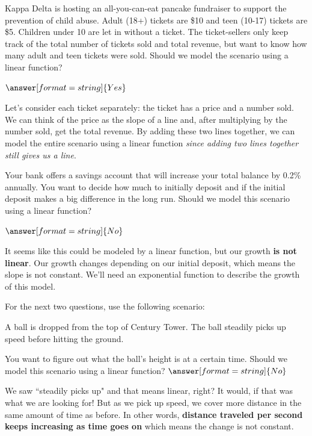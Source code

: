 \documentclass{ximera}
\begin{document}
\begin{question}
Kappa Delta is hosting an all-you-can-eat pancake fundraiser to support the prevention of child abuse. Adult (18+) tickets are \$10 and teen (10-17) tickets are \$5. Children under 10 are let in without a ticket. The ticket-sellers only keep track of the total number of tickets sold and total revenue, but want to know how many adult and teen tickets were sold. Should we model the scenario using a linear function?

$\answer[format=string]{Yes}$

\begin{feedback}
Let's consider each ticket separately: the ticket has a price and a number sold. We can think of the price as the slope of a line and, after multiplying by the number sold, get the total revenue. By adding these two lines together, we can model the entire scenario using a linear function \textit{since adding two lines together still gives us a line}.
\end{feedback}

\end{question}

\begin{question}
Your bank offers a savings account that will increase your total balance by 0.2\% annually. You want to decide how much to initially deposit and if the initial deposit makes a big difference in the long run. Should we model this scenario using a linear function?

$\answer[format=string]{No}$

\begin{feedback}
It seems like this could be modeled by a linear function, but our growth \textbf{is not linear}. Our growth changes depending on our initial deposit, which means the slope is not constant. We'll need an exponential function to describe the growth of this model. 
\end{feedback}
\end{question}


For the next two questions, use the following scenario:

A ball is dropped from the top of Century Tower. The ball steadily picks up speed before hitting the ground. 
\begin{question}
You want to figure out what the ball's height is at a certain time. Should we model this scenario using a linear function?
$\answer[format=string]{No}$

\begin{feedback}
We saw ``steadily picks up" and that means linear, right? It would, if that was what we are looking for! But as we pick up speed, we cover more distance in the same amount of time as before. In other words, \textbf{distance traveled per second keeps increasing as time goes on} which means the change is not constant. 
\end{feedback}
\end{question}
\end{document}

